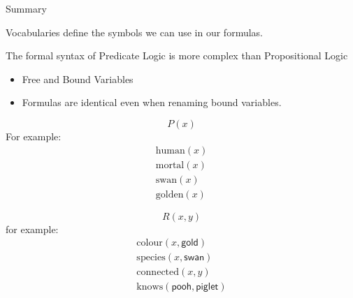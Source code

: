 \documentclass[xetex,aspectratio=169,14pt,hyperref={pdfpagelabels=true,pdflang={en-GB}}]{beamer}
\begin{document}
\begin{frame}
  {Summary}

  Vocabularies define the symbols we can use in our formulas.

  \bigskip


  The formal syntax of Predicate Logic is more complex than
  Propositional Logic
  \begin{itemize}
  \item Free and Bound Variables
  \item Formulas are identical even when renaming bound variables.
  \end{itemize}
\end{frame}



\begin{frame}[t]
  \begin{displaymath}
    P(x)
  \end{displaymath}
  For example:
  \begin{displaymath}
    \begin{array}{c}
      \mathrm{human}(x) \\
      \mathrm{mortal}(x) \\
      \mathrm{swan}(x) \\
      \mathrm{golden}(x)
    \end{array}
  \end{displaymath}
\end{frame}

\begin{frame}[t]
  \begin{displaymath}
    R(x,y)
  \end{displaymath}
  for example:
  \begin{displaymath}
    \begin{array}{c}
      \mathrm{colour}(x, \mathsf{gold}) \\
      \mathrm{species}(x, \mathsf{swan}) \\
      \mathrm{connected}(x,y) \\
      \mathrm{knows}(\mathsf{pooh},\mathsf{piglet})
    \end{array}
  \end{displaymath}
\end{frame}
\end{document}
